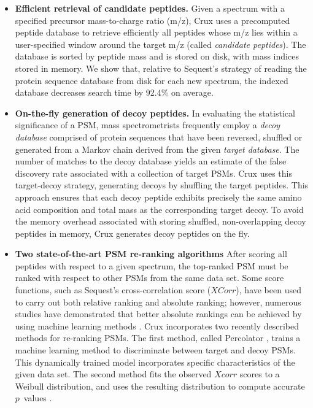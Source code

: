 \documentclass[12pt]{article}
\begin{document}
\begin{itemize}

\item {\bf Efficient retrieval of candidate peptides.}  Given a
  spectrum with a specified precursor mass-to-charge ratio (m/z), Crux
  uses a precomputed peptide database to retrieve efficiently all
  peptides whose m/z lies within a user-specified window around the
  target m/z (called {\em candidate peptides}).  The database is
  sorted by peptide mass and is stored on disk, with mass indices
  stored in memory.  We show that, relative to {\sc Sequest}'s strategy of
  reading the protein sequence database from disk for each new
  spectrum, the indexed database decreases search time by 92.4\% on
  average.


\item {\bf On-the-fly generation of decoy peptides.}  In evaluating
  the statistical significance of a PSM, mass spectrometrists
  frequently employ a {\em decoy database} comprised of protein
  sequences that have been reversed, shuffled or generated from a
  Markov chain derived from the given {\em target database}.  The
  number of matches to the decoy database yields an estimate of the
  false discovery rate associated with a collection of target PSMs.
  Crux uses this target-decoy strategy, generating decoys by shuffling
  the target peptides.  This approach ensures that each decoy peptide
  exhibits precisely the same amino acid composition and total mass as
  the corresponding target decoy.  To avoid the memory overhead
  associated with storing shuffled, non-overlapping decoy peptides in
  memory, Crux generates decoy peptides on the fly.

\item {\bf Two state-of-the-art PSM re-ranking algorithms} After
  scoring all peptides with respect to a given spectrum, the
  top-ranked PSM must be ranked with respect to other PSMs from the
  same data set.  Some score functions, such as {\sc Sequest}'s
  cross-correlation score ($XCorr$), have been used to carry out both
  relative ranking and absolute ranking; however, numerous studies
  have demonstrated that better absolute rankings can be achieved by
  using machine learning methods \cite{keller:empirical, anderson:new,
  elias:intensity, kall:semi-supervised}.  Crux incorporates two
  recently described methods for re-ranking PSMs.  The first method,
  called Percolator \cite{kall:semi-supervised}, trains a machine
  learning method to discriminate between target and decoy PSMs.  This
  dynamically trained model incorporates specific characteristics of
  the given data set.  The second method fits the observed $Xcorr$
  scores to a Weibull distribution, and uses the resulting
  distribution to compute accurate $p$~values \cite{klammer:not}.


\end{itemize}
\end{document}
